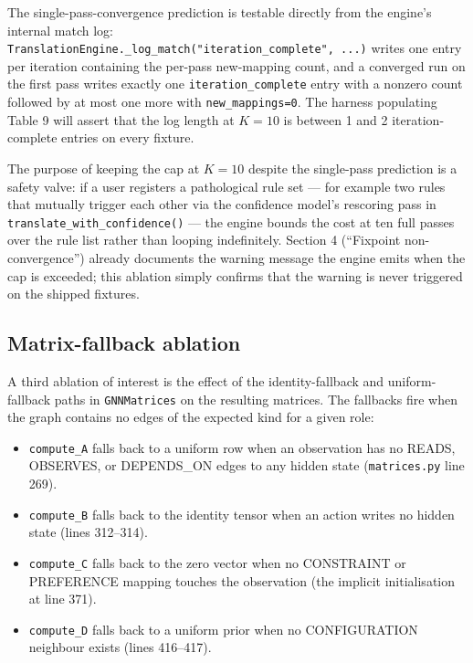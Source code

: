 \documentclass[
]{article}
\providecommand{\tightlist}{%
  \setlength{\itemsep}{0pt}\setlength{\parskip}{0pt}}
\begin{document}
The single-pass-convergence prediction is testable directly from the
engine's internal match log:
\texttt{TranslationEngine.\_log\_match("iteration\_complete",\ ...)}
writes one entry per iteration containing the per-pass new-mapping
count, and a converged run on the first pass writes exactly one
\texttt{iteration\_complete} entry with a nonzero count followed by at
most one more with \texttt{new\_mappings=0}. The harness populating
Table 9 will assert that the log length at \(K = 10\) is between 1 and 2
iteration-complete entries on every fixture.

The purpose of keeping the cap at \(K = 10\) despite the single-pass
prediction is a safety valve: if a user registers a pathological rule
set --- for example two rules that mutually trigger each other via the
confidence model's rescoring pass in
\texttt{translate\_with\_confidence()} --- the engine bounds the cost at
ten full passes over the rule list rather than looping indefinitely.
Section 4 (``Fixpoint non-convergence'') already documents the warning
message the engine emits when the cap is exceeded; this ablation simply
confirms that the warning is never triggered on the shipped fixtures.

\subsection{Matrix-fallback ablation}\label{matrix-fallback-ablation}

A third ablation of interest is the effect of the identity-fallback and
uniform-fallback paths in \texttt{GNNMatrices} on the resulting
matrices. The fallbacks fire when the graph contains no edges of the
expected kind for a given role:

\begin{itemize}
\tightlist
\item
  \texttt{compute\_A} falls back to a uniform row when an observation
  has no READS, OBSERVES, or DEPENDS\_ON edges to any hidden state
  (\texttt{matrices.py} line 269).
\item
  \texttt{compute\_B} falls back to the identity tensor when an action
  writes no hidden state (lines 312--314).
\item
  \texttt{compute\_C} falls back to the zero vector when no CONSTRAINT
  or PREFERENCE mapping touches the observation (the implicit
  initialisation at line 371).
\item
  \texttt{compute\_D} falls back to a uniform prior when no
  CONFIGURATION neighbour exists (lines 416--417).
\end{itemize}
\end{document}
